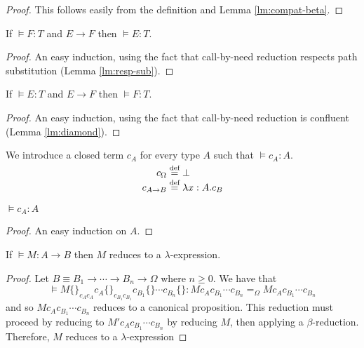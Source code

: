 \documentclass[a4paper,UKenglish]{lipics-v2016}
\newcommand*{\eqdef}{\mathrel{\smash{\stackrel{\text{def}}{=}}}}
\theoremstyle{plain}
\theoremstyle{definition}
\begin{document}
\begin{proof}
This follows easily from the definition and Lemma \ref{lm:compat-beta}.
\end{proof}

\begin{lemma}[Expansion]
\label{lm:expansion}
If $\models F : T$ and $E \rightarrow F$ then $\models E : T$.
\end{lemma}

\begin{proof}
An easy induction, using the fact that call-by-need reduction respects path substitution (Lemma \ref{lm:resp-sub}).
\end{proof}

\begin{lemma}[Reduction]
\label{lm:reduction}
If $\models E : T$ and $E \rightarrow F$ then $\models F : T$.
\end{lemma}

\begin{proof}
An easy induction, using the fact that call-by-need reduction is confluent (Lemma \ref{lm:diamond}).
\end{proof}

\begin{definition}
We introduce a closed term $c_A$ for every type $A$ such that $\models c_A : A$.
\begin{align*}
c_\Omega & \eqdef \bot \\
c_{A \rightarrow B} & \eqdef \lambda x:A.c_B
\end{align*}
\end{definition}

\begin{lemma}
$\models c_A : A$
\end{lemma}

\begin{proof}
An easy induction on $A$.
\end{proof}

\begin{lemma}
\label{lm:pre-ref-compute}
If $\models M : A \rightarrow B$ then $M$ reduces to a $\lambda$-expression.
\end{lemma}

\begin{proof}
Let $B \equiv B_1 \rightarrow \cdots \rightarrow B_n \rightarrow \Omega$ where $n \geq 0$.  We have that
\[ \models M \{\}_{c_Ac_A} c_A \{\}_{c_{B_1} c_{B_1}} c_{B_1} \{\} \cdots c_{B_n} \{\} : M c_{A} c_{B_1} \cdots c_{B_n} =_\Omega M c_{A} c_{B_1} \cdots c_{B_n} \]
and so $M c_A c_{B_1} \cdots c_{B_n}$ reduces to a canonical proposition.  This reduction must proceed by reducing to $M' c_A c_{B_1} \cdots c_{B_n}$ by reducing $M$,
then applying a $\beta$-reduction.  Therefore, $M$ reduces to a $\lambda$-expression
\end{proof}
\end{document}

